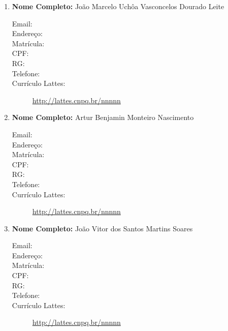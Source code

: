 \documentclass[a4paper,12pt]{article} %
\begin{document}
\begin{enumerate}
    \item \textbf{Nome Completo:} João Marcelo Uchôa Vasconcelos Dourado Leite
    \begin{description}
        \item [Email:] 
        \item [Endereço:]
        \item [Matrícula:]
        \item [CPF:]
        \item [RG:]
        \item [Telefone:]
        \item [Currículo Lattes:] \url{http://lattes.cnpq.br/nnnnn}
    \end{description}

    \item \textbf{Nome Completo:} Artur Benjamin Monteiro Nascimento
    \begin{description}
        \item [Email:] 
        \item [Endereço:]
        \item [Matrícula:]
        \item [CPF:]
        \item [RG:]
        \item [Telefone:]
        \item [Currículo Lattes:] \url{http://lattes.cnpq.br/nnnnn}
    \end{description}

      \item \textbf{Nome Completo:} João Vitor dos Santos Martins Soares
      \begin{description}
        \item [Email:] 
        \item [Endereço:]
        \item [Matrícula:]
        \item [CPF:]
        \item [RG:]
        \item [Telefone:]
        \item [Currículo Lattes:] \url{http://lattes.cnpq.br/nnnnn}
    \end{description}

\end{enumerate}
\end{document}
